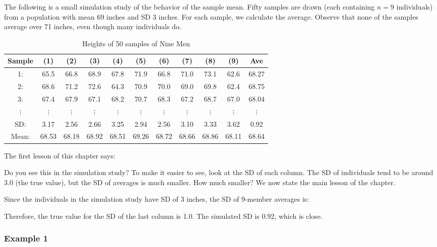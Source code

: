 \documentclass[11pt, chapterprefix=true]{scrbook}\usepackage[]{graphicx}\usepackage[]{color}
\begin{document}
The following is a small simulation study of the behavior of the sample mean.  Fifty samples are drawn (each containing $n = 9$ individuals) from a population with mean 69 inches and SD 3 inches.  For each sample, we calculate the average.  Observe that none of the samples average over 71 inches, even though many individuals do.

\begin{table}[ht]
\caption{Heights of 50 samples of Nine Men}
\begin{tabular}{@{} ccccccccccc @{}} \hline
Sample & (1)&(2)&(3)&(4)&(5)&(6)&(7)&(8)&(9)& Ave \\ \hline
1: &65.5&66.8&68.9&67.8&71.9&66.8&71.0&73.1&62.6&68.27 \\
2: &68.6&71.2&72.6&64.3&70.9&70.0&69.0&69.8&62.4&68.75 \\
3: &67.4&67.9&67.1&68.2&70.7&68.3&67.2&68.7&67.0&68.04 \\
$\vdots$ & $\vdots$ & $\vdots$ & $\vdots$ & $\vdots$ & $\vdots$ & $\vdots$ & $\vdots$ & $\vdots$ & $\vdots$ & $\vdots$ \\ \hline
SD: &3.17&2.56&2.66&3.25&2.94&2.56&3.10&3.33&3.62 & 0.92 \\
Mean: &68.53&68.18&68.92&68.51&69.26&68.72&68.66&68.86&68.11& 68.64 \\ \hline
\end{tabular}
\end{table}

The first lesson of this chapter says:


Do you see this in the simulation study?  To make it easier to see, look at the SD of each column.  The SD of individuals tend to be around 3.0 (the true value), but the SD of averages is much smaller.  How much smaller?  We now state the main lesson of the chapter.


Since the individuals in the simulation study have SD of 3 inches, the SD of 9-member averages is:


Therefore, the true value for the SD of the last column is 1.0.  The simulated SD is 0.92, which is close.

\subsubsection{Example 1}
\end{document}
